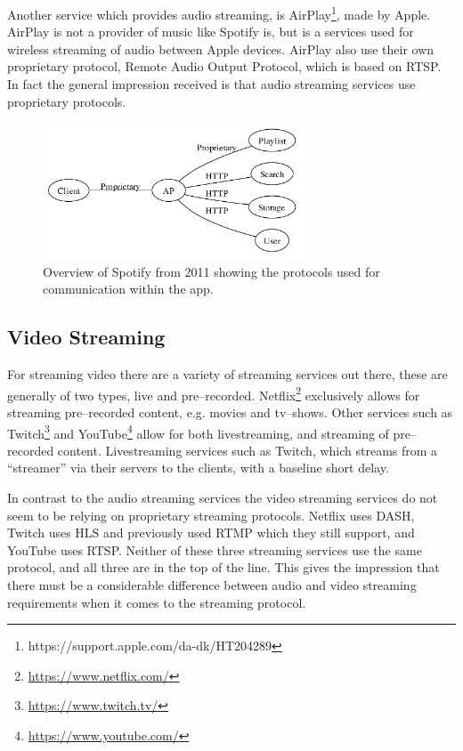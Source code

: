 Another service which provides audio streaming, is AirPlay\footnote{https://support.apple.com/da-dk/HT204289}, made by Apple.
AirPlay is not a provider of music like Spotify is, but is a services used for wireless streaming of audio between Apple devices.
AirPlay also use their own proprietary protocol, Remote Audio Output Protocol, which is based on \ac{RTSP}.
In fact the general impression received is that audio streaming services use proprietary protocols.

\begin{figure}[!bht]
    \centering
    \includegraphics[width=0.7\textwidth]{img/spotifyOverview.png}
    \caption{Overview of Spotify from 2011 showing the protocols used for communication within the app.\cite{spotifySlides}}
    \label{fig:spotifyOverview}
\end{figure}


\subsection{Video Streaming}
For streaming video there are a variety of streaming services out there, these are generally of two types, live and pre--recorded.
Netflix\footnote{\url{https://www.netflix.com/}} exclusively allows for streaming pre--recorded content, e.g. movies and tv--shows.
Other services such as Twitch\footnote{\url{https://www.twitch.tv/}} and YouTube\footnote{\url{https://www.youtube.com/}} allow for both livestreaming, and streaming of pre--recorded content.
Livestreaming services such as Twitch, which streams from a ``streamer'' via their servers to the clients, with a baseline short delay.

In contrast to the audio streaming services the video streaming services do not seem to be relying on proprietary streaming protocols.
Netflix uses \ac{DASH}, Twitch uses \ac{HLS} and previously used \ac{RTMP} which they still support, and YouTube uses \ac{RTSP}.\cite{netflix}\cite{twitch}\cite{youtube}
Neither of these three streaming services use the same protocol, and all three are in the top of the line.
This gives the impression that there must be a considerable difference between audio and video streaming requirements when it comes to the streaming protocol.

